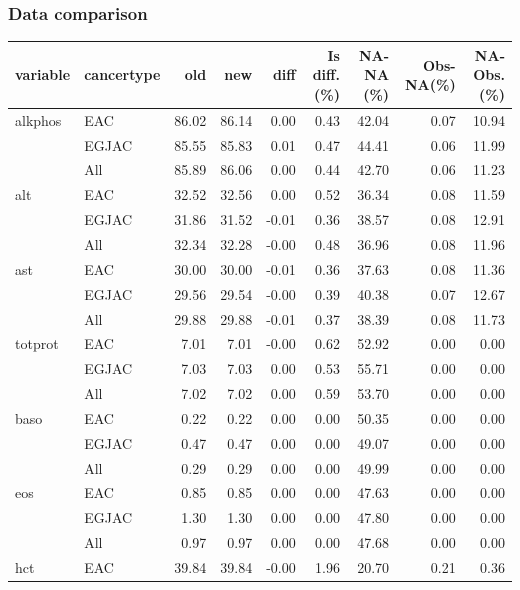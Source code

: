 \documentclass[12pt]{article}
\begin{document}
\subsubsection*{Data comparison}

\begin{table}[ht]
\centering
\begin{tabular}{llrrrrrrr}
  \toprule
variable & cancertype & old & new & diff & Is diff. (\%) & NA-NA (\%) & Obs-NA(\%)& NA-Obs.(\%) \\ 
  \midrule
  alkphos & EAC & 86.02 & 86.14 & 0.00 & 0.43 & 42.04 & 0.07 & 10.94 \\ 
   & EGJAC & 85.55 & 85.83 & 0.01 & 0.47 & 44.41 & 0.06 & 11.99 \\ 
   & All & 85.89 & 86.06 & 0.00 & 0.44 & 42.70 & 0.06 & 11.23 \\ \addlinespace
  alt & EAC & 32.52 & 32.56 & 0.00 & 0.52 & 36.34 & 0.08 & 11.59 \\ 
   & EGJAC & 31.86 & 31.52 & -0.01 & 0.36 & 38.57 & 0.08 & 12.91 \\ 
   & All & 32.34 & 32.28 & -0.00 & 0.48 & 36.96 & 0.08 & 11.96 \\  \addlinespace
  ast & EAC & 30.00 & 30.00 & -0.01 & 0.36 & 37.63 & 0.08 & 11.36 \\ 
   & EGJAC & 29.56 & 29.54 & -0.00 & 0.39 & 40.38 & 0.07 & 12.67 \\ 
   & All & 29.88 & 29.88 & -0.01 & 0.37 & 38.39 & 0.08 & 11.73 \\  \addlinespace
  totprot & EAC & 7.01 & 7.01 & -0.00 & 0.62 & 52.92 & 0.00 & 0.00 \\ 
   & EGJAC & 7.03 & 7.03 & 0.00 & 0.53 & 55.71 & 0.00 & 0.00 \\ 
   & All & 7.02 & 7.02 & 0.00 & 0.59 & 53.70 & 0.00 & 0.00 \\  \addlinespace
  baso & EAC & 0.22 & 0.22 & 0.00 & 0.00 & 50.35 & 0.00 & 0.00 \\ 
   & EGJAC & 0.47 & 0.47 & 0.00 & 0.00 & 49.07 & 0.00 & 0.00 \\ 
   & All & 0.29 & 0.29 & 0.00 & 0.00 & 49.99 & 0.00 & 0.00 \\  \addlinespace
  eos & EAC & 0.85 & 0.85 & 0.00 & 0.00 & 47.63 & 0.00 & 0.00 \\ 
   & EGJAC & 1.30 & 1.30 & 0.00 & 0.00 & 47.80 & 0.00 & 0.00 \\ 
   & All & 0.97 & 0.97 & 0.00 & 0.00 & 47.68 & 0.00 & 0.00 \\  \addlinespace
  hct & EAC & 39.84 & 39.84 & -0.00 & 1.96 & 20.70 & 0.21 & 0.36 \\ 

\end{tabular}
\end{table}
\end{document}
